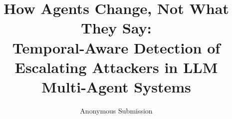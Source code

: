 \documentclass[letterpaper]{article} %
\title{How Agents Change, Not What They Say:\\Temporal-Aware Detection of Escalating Attackers in LLM Multi-Agent Systems}
\author{
    Anonymous Submission
}
\begin{document}
\maketitle

\begin{abstract}

\end{abstract}















% 
\end{document}
